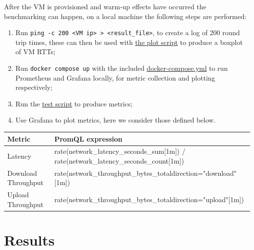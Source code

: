 \documentclass[11pt,a4paper]{article}
\begin{document}
After the VM is provisioned and warm-up effects have occurred the benchmarking can happen, on a local machine the following steps are performed:
\begin{enumerate}
  \item{Run \texttt{ping -c 200 <VM ip> > <result\_file>}, to create a log of 200 round trip times, these can then be used with \href{https://github.com/StefVuck/CloudSystemsAE1/blob/f39212e9e3b1d692e06152948270db8c1668b140/report/scripts/ping_boxplot.py}{the plot script} to produce a boxplot of VM RTTs;}
  \item{Run \texttt{docker compose up} with the included \href{https://github.com/StefVuck/CloudSystemsAE1/blob/f39212e9e3b1d692e06152948270db8c1668b140/network-client/docker-compose.yml}{docker-compose.yml} to run Prometheus and Grafana locally, for metric collection and plotting respectively;}
  \item{Run the \href{https://github.com/StefVuck/CloudSystemsAE1/blob/f39212e9e3b1d692e06152948270db8c1668b140/scripts/test.sh}{test script} to produce metrics;}
  \item{Use Grafana to plot metrics, here we consider those defined below.}
\end{enumerate}

\begin{center}
  \begin{tabular}{ll}
    Metric & PromQL expression \\
    \hline
Latency & rate(network\_latency\_seconds\_sum[1m]) / rate(network\_latency\_seconds\_count[1m]) \\

Download Throughput & rate(network\_throughput\_bytes\_total{direction="download"}[1m]) \\

Upload Throughput & rate(network\_throughput\_bytes\_total{direction="upload"}[1m]) \\

  \end{tabular}
\end{center}

\section*{Results}
\end{document}
